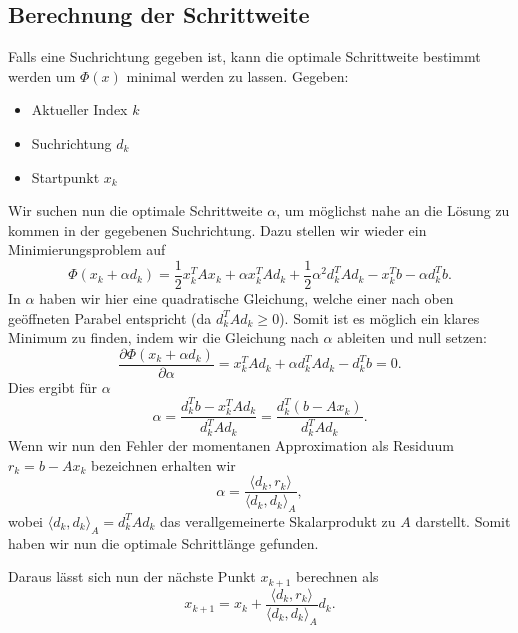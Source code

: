 \subsection{Berechnung der Schrittweite \label{cg:subsection:schrittweite}}
Falls eine Suchrichtung gegeben ist, kann die optimale Schrittweite bestimmt werden um $\Phi(x)$ minimal werden zu lassen.
Gegeben: 
\begin{itemize}
	\item Aktueller Index $k$
	\item Suchrichtung $d_k$
	\item Startpunkt $x_k$
\end{itemize}
Wir suchen nun die optimale Schrittweite $\alpha$, um möglichst nahe an die Lösung zu kommen in der gegebenen Suchrichtung.
Dazu stellen wir wieder ein Minimierungsproblem auf
\begin{equation}
	\Phi(x_k + \alpha d_k) 
	= 
	\frac{1}{2} x_k^T A x_k + \alpha x_k^T A d_k + \frac{1}{2} {\alpha}^2 d_k^T A d_k
	-
	x_k^T b - \alpha d_k^T b .
\end{equation}
In $\alpha$ haben wir hier eine quadratische Gleichung, welche einer nach oben geöffneten Parabel entspricht (da $d_k^T A d_k \ge 0$).
Somit ist es möglich ein klares Minimum zu finden, indem wir die Gleichung nach $\alpha$ ableiten und null setzen:
\begin{equation}
	\frac{\partial \Phi(x_k + \alpha d_k) }{\partial \alpha}
	= 
	x_k^T A d_k + \alpha  d_k^T A d_k - d_k^T b
	=
	0 .
\end{equation}
Dies ergibt für $\alpha$ 
\begin{equation}
	\alpha
	= 
	\frac{d_k^T b - x_k^T A d_k}{d_k^T A d_k}
	=
	\frac{d_k^T \left(b - A x_k\right)}{d_k^T A d_k}.
\end{equation}
Wenn wir nun den Fehler der momentanen Approximation als Residuum $r_k = b - A x_k$ bezeichnen erhalten wir
\begin{equation}
	\alpha
	= 
	\frac{\langle d_k , r_k \rangle}{\langle d_k , d_k \rangle_A},
\end{equation}
wobei $\langle d_k , d_k \rangle_A = d_k^T A d_k$ das verallgemeinerte Skalarprodukt zu $A$ darstellt.
Somit haben wir nun die optimale Schrittlänge gefunden.

Daraus lässt sich nun der nächste Punkt $x_{k+1}$ berechnen als
\begin{equation}
	x_{k+1} = x_k + \frac{\langle d_k , r_k \rangle}{\langle d_k , d_k \rangle_A} d_k.
\end{equation}

